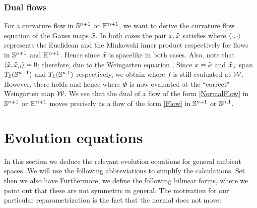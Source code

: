 \subsubsection*{Dual flows}
For a curvature flow
in $\S^{n+1}$ or $\H^{n+1}$, we want to derive the curvature flow equation of the Gauss maps $\~x$. In both cases the pair $x,\~x$ satisfies
where $\ip{\cdot}{\cdot}$ represents the Euclidean and the Minkowski inner product respectively for flows in $\S^{n+1}$ and $\H^{n+1}$.
Hence
since $\~x$ is spacelike in both cases. Also, note that $\ip{\~x}{\~x_{;i}}=0$; therefore, due to the Weingarten equation \cite[Lem.~9.2.4, Lem.~10.4.3]{Gerhardt:/2006},
Since $x=\~\nu$ and $\~x_{;i}$ span $T_{\~x}(\S^{n+1})$ and $T_{\~x}(\S^{n,1})$ respectively, we obtain
where $f$ is still evaluated at $\mc{W}$. However, there holds
and hence
where $\Phi$ is now evaluated at the ``correct" Weingarten map $\~{\mc{W}}$. We see that the dual of a flow of the form
\eqref{NormalFlow} in $\S^{n+1}$ or $\H^{n+1}$ moves precisely as a flow of the form \eqref{Flow} in $\S^{n+1}$ or $\S^{n,1}$.
\section{Evolution equations}
In this section we deduce the relevant evolution equations for general ambient spaces.
We will use the following abbreviations to simplify the calculations. Set
then we also have
Furthermore, we define the following bilinear forms,
where we point out that these are not symmetric in general.
The motivation for our particular reparametrization is the fact that the normal does not move:

